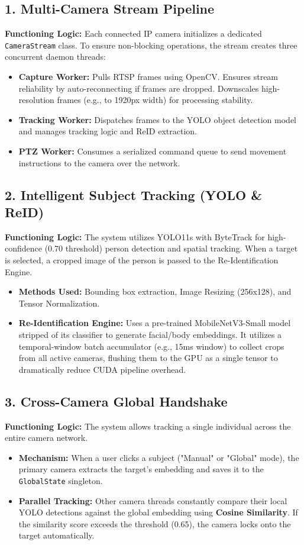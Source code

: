 \documentclass{article}
\begin{document}
\subsection{1. Multi-Camera Stream Pipeline}
\textbf{Functioning Logic:} Each connected IP camera initializes a dedicated \texttt{CameraStream} class. To ensure non-blocking operations, the stream creates three concurrent daemon threads:
\begin{itemize}
    \item \textbf{Capture Worker:} Pulls RTSP frames using OpenCV. Ensures stream reliability by auto-reconnecting if frames are dropped. Downscales high-resolution frames (e.g., to 1920px width) for processing stability.
    \item \textbf{Tracking Worker:} Dispatches frames to the YOLO object detection model and manages tracking logic and ReID extraction.
    \item \textbf{PTZ Worker:} Consumes a serialized command queue to send movement instructions to the camera over the network.
\end{itemize}

\subsection{2. Intelligent Subject Tracking (YOLO \& ReID)}
\textbf{Functioning Logic:} The system utilizes YOLO11s with ByteTrack for high-confidence (0.70 threshold) person detection and spatial tracking. When a target is selected, a cropped image of the person is passed to the Re-Identification Engine. 
\begin{itemize}
    \item \textbf{Methods Used:} Bounding box extraction, Image Resizing (256x128), and Tensor Normalization.
    \item \textbf{Re-Identification Engine:} Uses a pre-trained MobileNetV3-Small model stripped of its classifier to generate facial/body embeddings. It utilizes a temporal-window batch accumulator (e.g., 15ms window) to collect crops from all active cameras, flushing them to the GPU as a single tensor to dramatically reduce CUDA pipeline overhead.
\end{itemize}

\subsection{3. Cross-Camera Global Handshake}
\textbf{Functioning Logic:} The system allows tracking a single individual across the entire camera network.
\begin{itemize}
    \item \textbf{Mechanism:} When a user clicks a subject ("Manual" or "Global" mode), the primary camera extracts the target's embedding and saves it to the \texttt{GlobalState} singleton.
    \item \textbf{Parallel Tracking:} Other camera threads constantly compare their local YOLO detections against the global embedding using \textbf{Cosine Similarity}. If the similarity score exceeds the threshold (0.65), the camera locks onto the target automatically.
\end{itemize}
\end{document}
